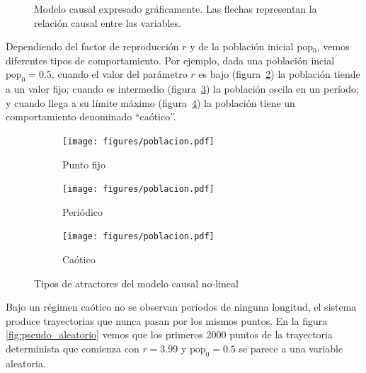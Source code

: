 \documentclass[a4paper,10pt]{book}
\theoremstyle{definition}
\begin{document}

\begin{figure}[ht!]
\centering
{}
\caption{Modelo causal expresado gráficamente. Las flechas representan la relación causal entre las variables. }
\label{fig:modelo_poblacional}
\end{figure}


Dependiendo del factor de reproducción $r$ y de la población inicial pop$_0$, vemos diferentes tipos de comportamiento.
%
Por ejemplo, dada una población incial $\text{pop}_0 = 0.5$, cuando el valor del parámetro $r$ es bajo (figura~\ref{fig:poblacion_punto_fijo}) la población tiende a un valor fijo;
cuando es intermedio (figura~\ref{fig:poblacion_periodico}) la población oscila en un período;
y cuando llega a su límite máximo (figura~\ref{fig:poblacion_caotico}) la población tiene un comportamiento denominado ``caótico''.
%
\begin{figure}[ht!]
    \centering
    \begin{subfigure}[b]{0.32\textwidth}
    \texttt{[image: figures/poblacion.pdf]}
    \caption{Punto fijo}
    \label{fig:poblacion_punto_fijo}
    \end{subfigure}
    \begin{subfigure}[b]{0.32\textwidth}
    \texttt{[image: figures/poblacion.pdf]}
    \caption{Periódico}
    \label{fig:poblacion_periodico}
    \end{subfigure}
    \begin{subfigure}[b]{0.32\textwidth}
    \texttt{[image: figures/poblacion.pdf]}
    \caption{Caótico}
    \label{fig:poblacion_caotico}
    \end{subfigure}
    \caption{
    Tipos de atractores del modelo causal no-lineal
    }
    \label{fig:poblacion}
\end{figure}
%
Bajo un régimen caótico no se observan períodos de ninguna longitud, el sistema produce trayectorias que nunca pasan por los mismos puntos.
%
En la figura \ref{fig:pseudo_aleatorio} vemos que los primeros 2000 puntos de la trayectoria determinista que comienza con $r=3.99$ y $\text{pop}_0 = 0.5$ se parece a una variable aleatoria.
\end{document}
